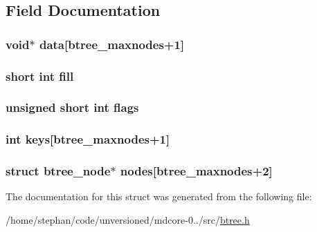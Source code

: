 \subsection{Field Documentation}
\hypertarget{structbtree__node_a3cfab63ed223a4bd84e8d785a0e3d9ef}{
\subsubsection[{data}]{\setlength{\rightskip}{0pt plus 5cm}void$\ast$ data\mbox{[}{\bf btree\-\_\-maxnodes}+1\mbox{]}}}\label{structbtree__node_a3cfab63ed223a4bd84e8d785a0e3d9ef}
\hypertarget{structbtree__node_a3848efec9b1ebaf57b640bab5471a270}{
\subsubsection[{fill}]{\setlength{\rightskip}{0pt plus 5cm}short int fill}}\label{structbtree__node_a3848efec9b1ebaf57b640bab5471a270}
\hypertarget{structbtree__node_ae718cba7f740adbac78a900ce25b73af}{
\subsubsection[{flags}]{\setlength{\rightskip}{0pt plus 5cm}unsigned short int flags}}\label{structbtree__node_ae718cba7f740adbac78a900ce25b73af}
\hypertarget{structbtree__node_acd615dd3caebe0bb636e606f308ad51b}{
\subsubsection[{keys}]{\setlength{\rightskip}{0pt plus 5cm}int keys\mbox{[}{\bf btree\-\_\-maxnodes}+1\mbox{]}}}\label{structbtree__node_acd615dd3caebe0bb636e606f308ad51b}
\hypertarget{structbtree__node_ae6d749deeab477d1ebbca6ed1033da3c}{
\subsubsection[{nodes}]{\setlength{\rightskip}{0pt plus 5cm}struct {\bf btree\-\_\-node}$\ast$ nodes\mbox{[}{\bf btree\-\_\-maxnodes}+2\mbox{]}}}\label{structbtree__node_ae6d749deeab477d1ebbca6ed1033da3c}


The documentation for this struct was generated from the following file\-:\begin{DoxyCompactItemize}
\item 
/home/stephan/code/unversioned/mdcore-\/0../src/\hyperlink{btree_8h}{btree.\-h}\end{DoxyCompactItemize}
